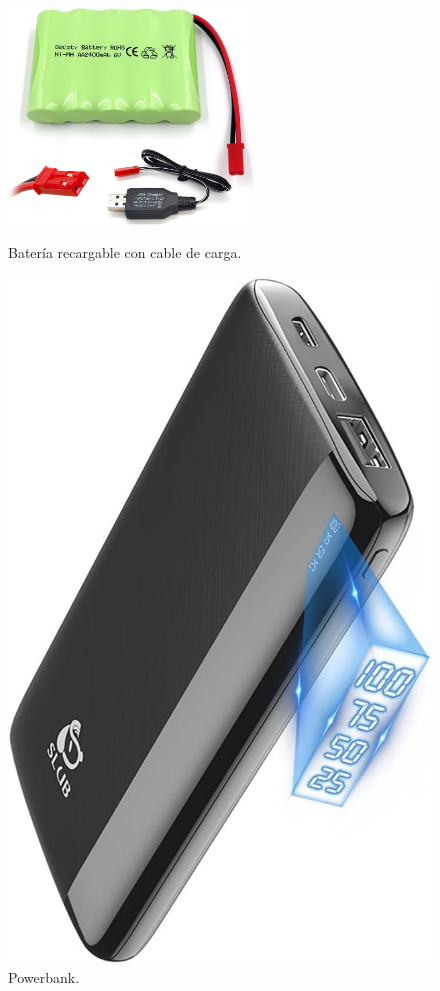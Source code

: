 \begin{figure}[H]
  \begin{minipage}{0.48\textwidth}
    \centering
    \includegraphics[width=6.5cm]{figs/bateria.jpg}
    \caption{Batería recargable con cable de carga.}
    \label{fig:bateria}
  \end{minipage}
  \hfill
  \begin{minipage}{0.48\textwidth}
    \centering
    \includegraphics[scale=0.13]{figs/powerbank.jpg}
    \caption{Powerbank.} 
    \label{fig:Powerbank}
  \end{minipage}
\end{figure}

